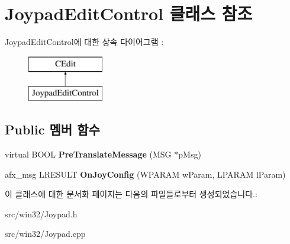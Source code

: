 \hypertarget{class_joypad_edit_control}{}\section{Joypad\+Edit\+Control 클래스 참조}
\label{class_joypad_edit_control}
Joypad\+Edit\+Control에 대한 상속 다이어그램 \+: \begin{figure}[H]
\begin{center}
\leavevmode
\includegraphics[height=2.000000cm]{class_joypad_edit_control}
\end{center}
\end{figure}
\subsection*{Public 멤버 함수}
\begin{DoxyCompactItemize}
\item 
\mbox{\label{class_joypad_edit_control_abeca620abd7b0118c1d044f9480bbede}} 
virtual B\+O\+OL {\bfseries Pre\+Translate\+Message} (M\+SG $\ast$p\+Msg)
\item 
\mbox{\label{class_joypad_edit_control_a26c5c6132fe22f6947adc741c930504e}} 
afx\+\_\+msg L\+R\+E\+S\+U\+LT {\bfseries On\+Joy\+Config} (W\+P\+A\+R\+AM w\+Param, L\+P\+A\+R\+AM l\+Param)
\end{DoxyCompactItemize}


이 클래스에 대한 문서화 페이지는 다음의 파일들로부터 생성되었습니다.\+:\begin{DoxyCompactItemize}
\item 
src/win32/Joypad.\+h\item 
src/win32/Joypad.\+cpp\end{DoxyCompactItemize}

